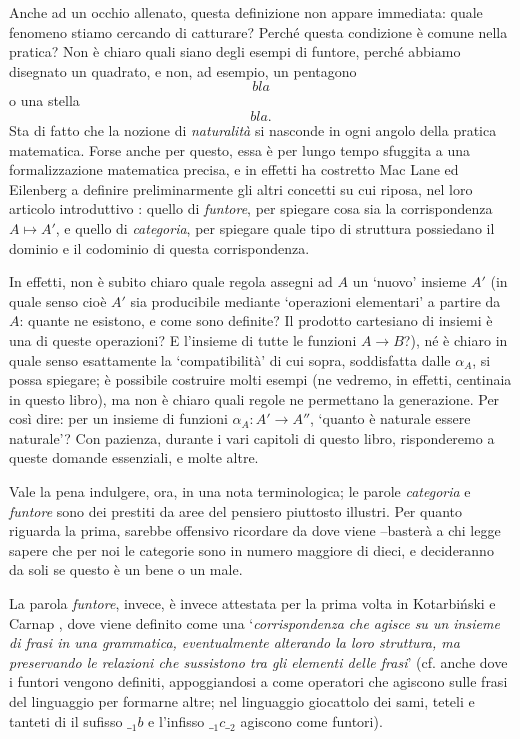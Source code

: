 Anche ad un occhio allenato, questa definizione non appare immediata: quale fenomeno stiamo cercando di catturare? Perché questa condizione è comune nella pratica? Non è chiaro quali siano degli esempi di funtore, perché abbiamo disegnato un quadrato, e non, ad esempio, un pentagono
\[bla\]
o una stella
\[bla.\]
Sta di fatto che la nozione di \emph{naturalità} si nasconde in ogni angolo della pratica matematica. Forse anche per questo, essa è per lungo tempo sfuggita a una formalizzazione matematica precisa, e in effetti ha costretto Mac Lane ed Eilenberg a definire preliminarmente gli altri concetti su cui riposa, nel loro articolo introduttivo \cite{gtone}: quello di \emph{funtore}, per spiegare cosa sia la corrispondenza $A\mapsto A'$, e quello di \emph{categoria}, per spiegare quale tipo di struttura possiedano il dominio e il codominio di questa corrispondenza.

In effetti, non è subito chiaro quale regola assegni ad $A$ un `nuovo' insieme $A'$ (in quale senso cioè $A'$ sia producibile mediante `operazioni elementari' a partire da $A$: quante ne esistono, e come sono definite? Il prodotto cartesiano di insiemi è una di queste operazioni? E l'insieme di tutte le funzioni $A\to B$?), né è chiaro in quale senso esattamente la `compatibilità' di cui sopra, soddisfatta dalle $\alpha_A$, si possa spiegare; è possibile costruire molti esempi (ne vedremo, in effetti, centinaia in questo libro), ma non è chiaro quali regole ne permettano la generazione. Per così dire: per un insieme di funzioni $\alpha_A : A' \to A''$, `quanto è naturale essere naturale'? Con pazienza, durante i vari capitoli di questo libro, risponderemo a queste domande essenziali, e molte altre.

\medskip
Vale la pena indulgere, ora, in una nota terminologica; le parole \emph{categoria} e \emph{funtore} sono dei prestiti da aree del pensiero piuttosto illustri. Per quanto riguarda la prima, sarebbe offensivo ricordare da dove viene --basterà a chi legge sapere che per noi le categorie sono in numero maggiore di dieci, e decideranno da soli se questo è un bene o un male.

La parola \emph{funtore}, invece, è invece attestata per la prima volta in Kotarbi\'nski \cite{kotarbione} e Carnap \cite{carnappio}, dove viene definito come una `\emph{corrispondenza che agisce su un insieme di frasi in una grammatica, eventualmente alterando la loro struttura, ma preservando le relazioni che sussistono tra gli elementi delle frasi}' (cf. anche \cite{Curry1961SomeLA} dove i funtori vengono definiti, appoggiandosi a \cite{kotarbione} come operatori che agiscono sulle frasi del linguaggio per formarne altre; nel linguaggio giocattolo dei sami, teteli e tanteti di \cite{Curry1961SomeLA} il sufisso ${\_}_1b$ e l'infisso ${\_}_1 c {\_}_2$ agiscono come funtori).

